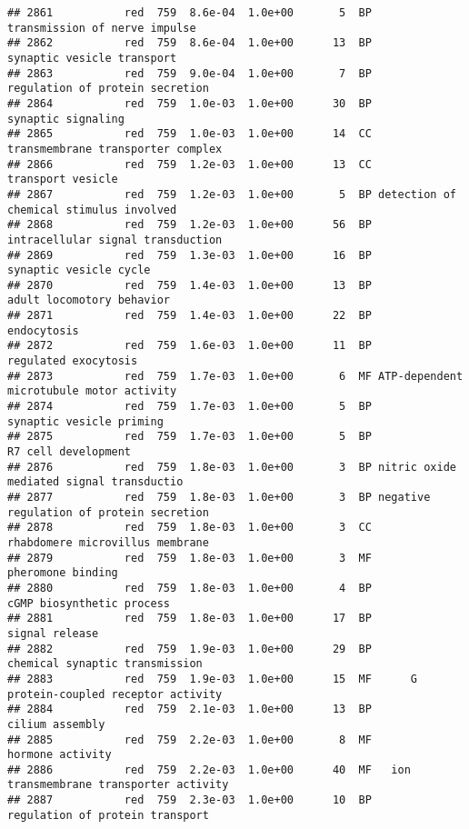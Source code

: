 \documentclass[]{article}
\begin{document}
\begin{verbatim}
## 2861           red  759  8.6e-04  1.0e+00       5  BP            transmission of nerve impulse
## 2862           red  759  8.6e-04  1.0e+00      13  BP               synaptic vesicle transport
## 2863           red  759  9.0e-04  1.0e+00       7  BP          regulation of protein secretion
## 2864           red  759  1.0e-03  1.0e+00      30  BP                       synaptic signaling
## 2865           red  759  1.0e-03  1.0e+00      14  CC        transmembrane transporter complex
## 2866           red  759  1.2e-03  1.0e+00      13  CC                        transport vesicle
## 2867           red  759  1.2e-03  1.0e+00       5  BP detection of chemical stimulus involved 
## 2868           red  759  1.2e-03  1.0e+00      56  BP        intracellular signal transduction
## 2869           red  759  1.3e-03  1.0e+00      16  BP                   synaptic vesicle cycle
## 2870           red  759  1.4e-03  1.0e+00      13  BP                adult locomotory behavior
## 2871           red  759  1.4e-03  1.0e+00      22  BP                              endocytosis
## 2872           red  759  1.6e-03  1.0e+00      11  BP                     regulated exocytosis
## 2873           red  759  1.7e-03  1.0e+00       6  MF ATP-dependent microtubule motor activity
## 2874           red  759  1.7e-03  1.0e+00       5  BP                 synaptic vesicle priming
## 2875           red  759  1.7e-03  1.0e+00       5  BP                      R7 cell development
## 2876           red  759  1.8e-03  1.0e+00       3  BP nitric oxide mediated signal transductio
## 2877           red  759  1.8e-03  1.0e+00       3  BP negative regulation of protein secretion
## 2878           red  759  1.8e-03  1.0e+00       3  CC          rhabdomere microvillus membrane
## 2879           red  759  1.8e-03  1.0e+00       3  MF                        pheromone binding
## 2880           red  759  1.8e-03  1.0e+00       4  BP                cGMP biosynthetic process
## 2881           red  759  1.8e-03  1.0e+00      17  BP                           signal release
## 2882           red  759  1.9e-03  1.0e+00      29  BP           chemical synaptic transmission
## 2883           red  759  1.9e-03  1.0e+00      15  MF      G protein-coupled receptor activity
## 2884           red  759  2.1e-03  1.0e+00      13  BP                          cilium assembly
## 2885           red  759  2.2e-03  1.0e+00       8  MF                         hormone activity
## 2886           red  759  2.2e-03  1.0e+00      40  MF   ion transmembrane transporter activity
## 2887           red  759  2.3e-03  1.0e+00      10  BP          regulation of protein transport

\end{verbatim}
\end{document}
